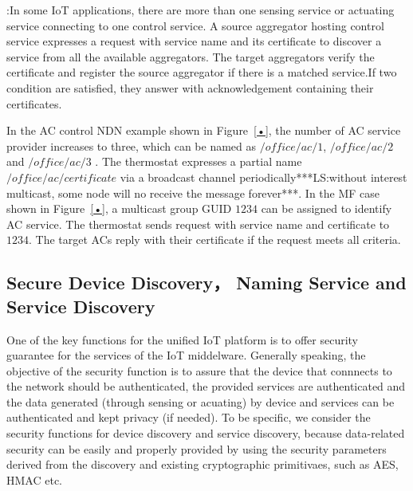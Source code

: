 \vspace{1mm}:In some IoT applications, there are more than one sensing service or actuating service connecting to one control service. A source aggregator hosting control service expresses a request with service name and its certificate to discover a service from all the available aggregators. The target aggregators verify the certificate and register the source   aggregator if there is a matched service.If two condition are satisfied, they answer with acknowledgement containing their certificates.

In the AC control NDN example shown in Figure~\ref{•}, the number of AC service provider increases to three, which can be named as $/office/ac/1$, $/office/ac/2$ and $/office/ac/3$ . The thermostat expresses a partial name $/office/ac/certificate$ via a broadcast channel periodically***LS:without interest multicast, some node will no receive the message forever***. In the MF case shown in Figure~\ref{•}, a multicast group GUID $1234$ can be assigned to identify AC service. The thermostat sends request with service name and certificate to $1234$. The target ACs reply with their certificate if the request meets all criteria.

\subsection{Secure Device Discovery， Naming Service and Service Discovery}
One of the key functions for the unified IoT platform is to offer security guarantee for the services of the IoT middelware. Generally speaking, the objective of the security function is to assure that the device that connnects to the network should be authenticated, the provided services are authenticated  and the data generated (through sensing or acuating) by device and services can be authenticated and kept privacy (if needed).   To be specific,  we consider the security functions for device discovery and service discovery, because data-related security can be easily and properly provided  by using the security parameters derived from the discovery and existing cryptographic primitivaes, such as AES, HMAC etc. 

